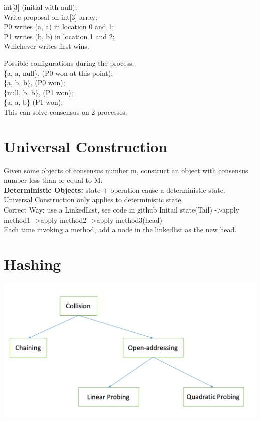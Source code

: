 \documentclass[twoside]{article}
\begin{document}
	int[3] (initial with null);\\
	Write proposal on int[3] array;\\
	P0 writes (a, a) in location 0 and 1;\\
	P1 writes (b, b) in location 1 and 2;\\
	Whichever writes first wins.
	
	Possible configurations during the process:\\
	\{a, a, null\}, (P0 won at this point);\\
	\{a, b, b\}, (P0 won);\\
	\{null, b, b\}, (P1 won);\\
	\{a, a, b\} (P1 won);\\
	
	This can solve consensus on 2 processes.
	
	\section{Universal Construction}
	Given some objects of consensus number m, construct an object with consensus number less than or equal to M.\\
	\textbf{Deterministic Objects:} state + operation cause a deterministic state.\\
	Universal Construction only applies to deterministic state.\\
	Correct Way: use a LinkedList, see code in github
	Initail state(Tail) -\textgreater apply method1 -\textgreater apply method2 -\textgreater apply method3(head) \\
	Each time invoking a method, add a node in the linkedlist as the new head.
	
	\section{Hashing}
	
	\begin{center}
		\includegraphics[scale=0.7]{hashing.png}
	\end{center}
	
\end{document}
